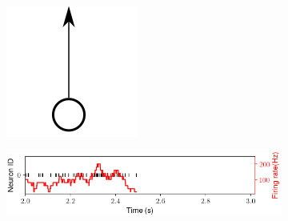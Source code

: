 \begin{figure}[h!]
  \centering
  \begin{subfigure}{.1\textwidth}
  \centering
  \includegraphics[width=.6\textwidth]{img/chapter4/Input_only.png}
  \caption{}
  \label{fig:single_cluster_inp_sketch}
  \end{subfigure}
  \hfill
  \begin{subfigure}{.5\textwidth}
    \centering
    \includegraphics[width=\textwidth]{img/chapter4/raster_inp.png}
    \caption{}
    \label{fig:single_cluster_input_raster}
  \end{subfigure}
  \hfill
  \begin{subfigure}{.3\textwidth}
  \parbox{\textwidth}{}  
  \end{subfigure}
  \\ 
  \begin{subfigure}{.1\textwidth}
    \centering

\end{subfigure}
\end{figure}
